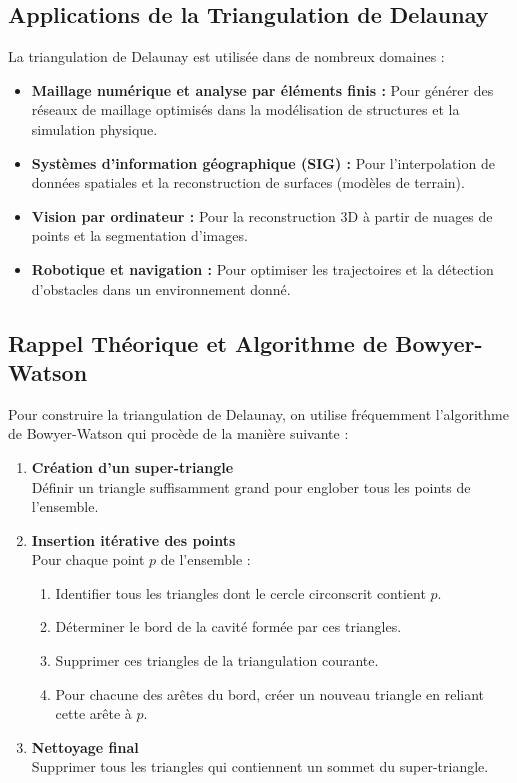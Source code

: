 \documentclass[a4paper,12pt]{article}
\theoremstyle{definition}
\begin{document}
\subsection{Applications de la Triangulation de Delaunay}

La triangulation de Delaunay est utilisée dans de nombreux domaines :
\begin{itemize}
  \item \textbf{Maillage numérique et analyse par éléments finis :} Pour générer des réseaux de maillage optimisés dans la modélisation de structures et la simulation physique.
  \item \textbf{Systèmes d'information géographique (SIG) :} Pour l'interpolation de données spatiales et la reconstruction de surfaces (modèles de terrain).
  \item \textbf{Vision par ordinateur :} Pour la reconstruction 3D à partir de nuages de points et la segmentation d'images.
  \item \textbf{Robotique et navigation :} Pour optimiser les trajectoires et la détection d'obstacles dans un environnement donné.
\end{itemize}

\subsection{Rappel Théorique et Algorithme de Bowyer-Watson}

Pour construire la triangulation de Delaunay, on utilise fréquemment l'algorithme de Bowyer-Watson qui procède de la manière suivante :

\begin{enumerate}
  \item \textbf{Création d'un super-triangle} \\
  Définir un triangle suffisamment grand pour englober tous les points de l'ensemble.

  \item \textbf{Insertion itérative des points} \\
  Pour chaque point \(p\) de l'ensemble :
  \begin{enumerate}
    \item Identifier tous les triangles dont le cercle circonscrit contient \(p\).
    \item Déterminer le bord de la cavité formée par ces triangles.
    \item Supprimer ces triangles de la triangulation courante.
    \item Pour chacune des arêtes du bord, créer un nouveau triangle en reliant cette arête à \(p\).
  \end{enumerate}

  \item \textbf{Nettoyage final} \\
  Supprimer tous les triangles qui contiennent un sommet du super-triangle.
\end{enumerate}
\end{document}
